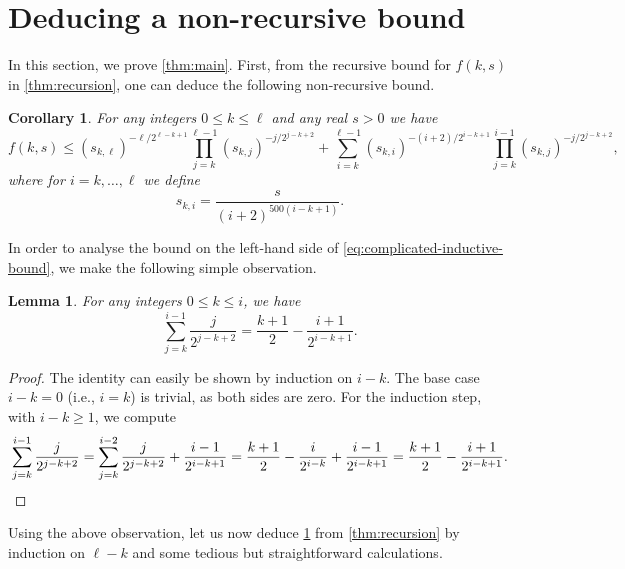 \documentclass[english]{article}
\newtheorem{lemma}[theorem]{Lemma}
\newtheorem{corollary}[theorem]{Corollary}
\theoremstyle{remark}
\numberwithin{equation}{section}
\numberwithin{figure}{section}
\begin{document}
\section{Deducing a non-recursive bound}\label{sec:calculation-deduction}

In this section, we prove \cref{thm:main}. First, from the recursive bound for $f(k,s)$ in \cref{thm:recursion}, one can deduce the following non-recursive bound.

\begin{corollary}\label{cor:induction}
For any integers $0\le k\le \ell$ and any real $s>0$ we have
\begin{equation}\label{eq:complicated-inductive-bound}
f(k,s)\le (s_{k,\ell})^{-\ell/2^{\ell-k+1}}\prod_{j=k}^{\ell-1}(s_{k,j})^{-j/2^{j-k+2}}+\sum_{i=k}^{\ell-1}(s_{k,i})^{-(i+2)/2^{i-k+1}}\prod_{j=k}^{i-1}(s_{k,j})^{-j/2^{j-k+2}},
\end{equation}
where for $i=k,\dots,\ell$ we define
\[
s_{k,i}=\frac{s}{(i+2)^{500(i-k+1)}}.
\]
\end{corollary}

In order to analyse the bound on the left-hand side of \cref{eq:complicated-inductive-bound}, we make the following simple observation.

\begin{lemma}\label{lem:sum-identity}
For any integers $0\le k\le i$, we have
\[
\sum_{j=k}^{i-1}\frac{j}{2^{j-k+2}}=\frac{k+1}{2}-\frac{i+1}{2^{i-k+1}}.
\]
\end{lemma}
\begin{proof}
The identity can easily be shown by induction on $i-k$. The base case $i-k=0$ (i.e., $i=k$) is trivial, as both sides are zero. For the induction step, with $i-k\ge 1$, we compute
\[\sum_{j=k}^{i-1}\frac{j}{2^{j-k+2}}=\sum_{j=k}^{i-2}\frac{j}{2^{j-k+2}}+\frac{i-1}{2^{i-k+1}}=\frac{k+1}{2}-\frac{i}{2^{i-k}}+\frac{i-1}{2^{i-k+1}}=\frac{k+1}{2}-\frac{i+1}{2^{i-k+1}}.\qedhere\]
\end{proof}

Using the above observation, let us now deduce \cref{cor:induction} from \cref{thm:recursion} by induction on $\ell-k$ and some tedious but straightforward calculations.
\end{document}
